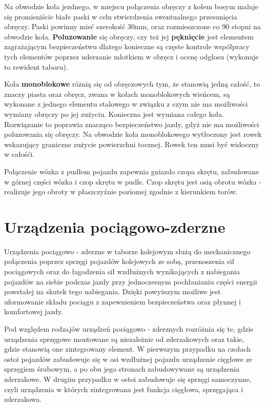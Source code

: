 Na obwodzie koła jezdnego, w miejscu połączenia obręczy z kołem bosym maluje się promieniście białe paski w celu stwierdzenia ewentualnego przesunięcia obręczy. Paski powinny mieć szerokość 30mm, oraz rozmieszczone co 90 stopni na obwodzie koła. \textbf{Poluzowanie} się obręczy, czy też jej \textbf{pęknięcie} jest elementem zagrażającym bezpieczeństwu dlatego konieczne są częste kontrole współpracy tych elementów poprzez uderzanie młotkiem w obręcz i ocenę odgłosu (wykonuje to rewident taboru). 

Koła \textbf{monoblokowe} różnią się od obręczowych tym, że stanowią jedną całość, to znaczy piasta oraz obręcz, zwana w kołach monoblokowych wieńcem, są wykonane z jednego elementu stalowego w związku z czym nie ma możliwości wymiany obręczy po jej zużyciu. Konieczna jest wymiana całego koła. Rozwiązanie to poprawia znacząco bezpieczeństwo jazdy, gdyż nie ma możliwości poluzowania się obręczy. Na obwodzie koła monoblokowego wytłoczony jest rowek wskazujący graniczne zużycie powierzchni tocznej. Rowek ten musi być widoczny w całośći.

Połączenie wózka z pudłem pojazdu zapewnia gniazdo czopa skrętu, zabudowane w górnej części wózka i czop skrętu w pudle. Czop skrętu jest osią obrotu wózka - realizuje jego obroty w płaszczyźnie poziomej zgodnie z kierunkiem torów.  

\section{Urządzenia pociągowo-zderzne}

Urządzenia pociągowo - zderzne w taborze kolejowym służą do mechanicznego połączenia poprzez sprzęgi pojazdów kolejowych ze sobą, przenoszenia sił pociągowych oraz do łagodzenia sił wzdłużnych wynikających z nabiegania pojazdów na siebie podczas jazdy przy jednoczesnym pochłanianiu części energii powstałej na skutek tego nabiegania. Dzięki powyższym możliwe jest uformowanie składu pociągu z zapewnieniem bezpieczeństwa oraz płynnej i komfortowej jazdy.

Pod względem rodzajów urządzeń pociągowo - zderznych rozróżnia się te, gdzie urządzenia sprzęgowe montowane są niezależnie od zderzakowych oraz takie, gdzie stanowią one zintegrowany element.
W pierwszym przypadku na czołach ostoi pojazdów zabudowuje się w osi wzdłużnej pojazdu urządzenie cięgłowe ze sprzęgiem śrubowym, a po obu jego stronach zabudowywane są urządzenia zderzakowe. W drugim przypadku w ostoi zabudowuje się sprzęgi samoczynne, czyli urządzenia w których zintegrowana jest funkcja cięgłowa, sprzęgająca i zderzakowa.

